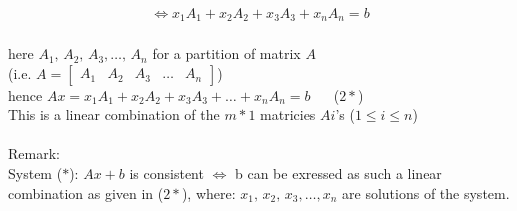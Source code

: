 \documentclass{jhwhw}
\begin{document}
\begin{align*} \Leftrightarrow x_1 A_1 + x_2 A_2 + x_3 A_3 + x_n A_n = b \end{align*}\\

here \(A_1, \, A_2, \, A_3, \ldots, \, A_n\) for a partition of matrix \(A\)\\
(i.e. \(A = \begin{bmatrix} A_1 & A_2 & A_3 & \ldots & A_n\end{bmatrix}\))\\

hence \(Ax = x_1 A_1 + x_2 A_2 + x_3 A_3 + \ldots + x_n A_n = b\) \(\quad\) (\(2\ast\))\\
This is a linear combination of the \(m*1\) matricies \(Ai\)'s (\(1 \leq i  \leq n\))
\\ \\
Remark:\\
System (\(\ast\)): \(Ax+b\) is consistent \(\iff\) b can be exressed as such a linear combination as given in (\(2\ast\)), where: \(x_1, \, x_2, \, x_3, \ldots, x_n\) are solutions of the system.
\end{document}
